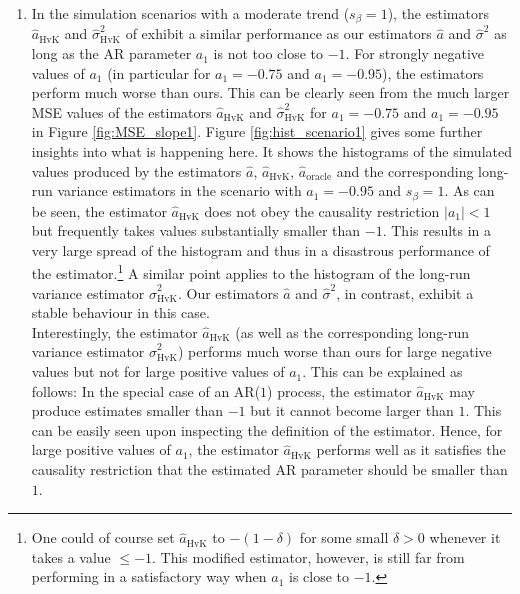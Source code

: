 \begin{enumerate}[label=(\alph*),leftmargin=0.7cm]

\item In the simulation scenarios with a moderate trend ($s_\beta = 1$), the estimators $\widehat{a}_{\text{HvK}}$ and $\widehat{\sigma}^2_{\text{HvK}}$ of \cite{Hall2003} exhibit a similar performance as our estimators $\widehat{a}$ and $\widehat{\sigma}^2$ as long as the AR parameter $a_1$ is not too close to $-1$. For strongly negative values of $a_1$ (in particular for $a_1 = -0.75$ and $a_1 = -0.95$), the estimators perform much worse than ours. This can be clearly seen from the much larger MSE values of the estimators  $\widehat{a}_{\text{HvK}}$ and $\widehat{\sigma}^2_{\text{HvK}}$ for $a_1 = -0.75$ and $a_1 = -0.95$ in Figure \ref{fig:MSE_slope1}. Figure \ref{fig:hist_scenario1} gives some further insights into what is happening here. It shows the histograms of the simulated values produced by the estimators $\widehat{a}$, $\widehat{a}_{\text{HvK}}$, $\widehat{a}_{\text{oracle}}$ and the corresponding long-run variance estimators in the scenario with $a_1=-0.95$ and $s_\beta = 1$. As can be seen, the estimator $\widehat{a}_{\text{HvK}}$ does not obey the causality restriction $|a_1| < 1$ but frequently takes values substantially smaller than $-1$. This results in a very large spread of the histogram and thus in a disastrous performance of the estimator.\footnote{One could of course set $\widehat{a}_{\text{HvK}}$ to $-(1 - \delta)$ for some small $\delta > 0$ whenever it takes a value $\le -1$. This modified estimator, however, is still far from performing in a satisfactory way when $a_1$ is close to $-1$.} A similar point applies to the histogram of the long-run variance estimator $\widehat{\sigma}^2_{\text{HvK}}$. Our estimators $\widehat{a}$ and $\widehat{\sigma}^2$, in contrast, exhibit a stable behaviour in this case. \\ 
Interestingly, the estimator $\widehat{a}_{\text{HvK}}$ (as well as the corresponding long-run variance estimator $\widehat{\sigma}^2_{\text{HvK}}$) performs much worse than ours for large negative values but not for large positive values of $a_1$. This can be explained as follows: In the special case of an AR($1$) process, the estimator $\widehat{a}_{\text{HvK}}$ may produce estimates smaller than $-1$ but it cannot become larger than $1$. This can be easily seen upon inspecting the definition of the estimator. Hence, for large positive values of $a_1$, the estimator $\widehat{a}_{\text{HvK}}$ performs well as it satisfies the causality restriction that the estimated AR parameter should be smaller than $1$. 


\end{enumerate}
